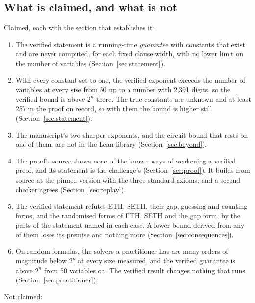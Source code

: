 \subsection{What is claimed, and what is not}
\label{sec:intro-claims}

Claimed, each with the section that establishes it:
\begin{enumerate}
\item The verified statement is a running-time \emph{guarantee} with
  constants that exist and are never computed, for each fixed clause
  width, with no lower limit on the number of variables
  (Section~\ref{sec:statement}).
\item With every constant set to one, the verified exponent exceeds the
  number of variables at every size from 50 up to a number with 2,391
  digits, so the verified bound is above $2^n$ there. The true constants
  are unknown and at least 257 in the proof on record, so with them the
  bound is higher still (Section~\ref{sec:statement}).
\item The manuscript's two sharper exponents, and the circuit bound that
  rests on one of them, are not in the Lean library
  (Section~\ref{sec:beyond}).
\item The proof's source shows none of the known ways of weakening a
  verified proof, and its statement is the challenge's
  (Section~\ref{sec:proof}). It builds from source at the pinned
  version with the three standard axioms, and a second checker agrees
  (Section~\ref{sec:replay}).
\item The verified statement refutes ETH, SETH, their gap, guessing and
  counting forms, and the randomised forms of ETH, SETH and the gap
  form, by the parts of the statement named in each case. A lower bound
  derived from any of them loses its premise and nothing more
  (Section~\ref{sec:consequences}).
\item On random formulas, the solvers a practitioner has are many
  orders of magnitude below $2^n$ at every size measured, and the
  verified guarantee is above $2^n$ from 50 variables on. The verified
  result changes nothing that runs (Section~\ref{sec:practitioner}).
\end{enumerate}
Not claimed:

